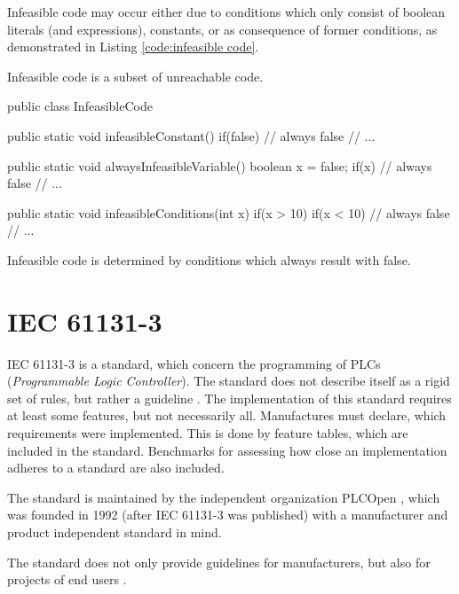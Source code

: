 Infeasible code may occur either due to conditions which only consist of boolean literals (and expressions), constants, or as consequence of former conditions, as demonstrated in Listing \ref{code:infeasible code}.

Infeasible code is a subset of unreachable code.
\begin{program}
	\begin{JavaCode}
public class InfeasibleCode {
	public static void infeasibleConstant() {
		if(false) {
			// always false
			// ...
		}
	}
			
	public static void alwaysInfeasibleVariable() {
		boolean x = false;
		if(x) {
			// always false
			// ...
		}
	}
			
	public static void infeasibleConditions(int x) {
		if(x > 10) {
			if(x < 10) {
				// always false
				// ...
			}
		}
	}
}\end{JavaCode}
	\caption{Infeasible code is determined by conditions which always result with false. }
	\label{code:infeasible code}
\end{program}




\section{IEC 61131-3}
\label{sec:iec}

IEC 61131-3 is a standard, which concern the programming of PLCs (\emph{Programmable Logic Controller}). The standard does not describe itself as a rigid set of rules, but rather a guideline \cite{johnIEC611313Programming2010}. The implementation of this standard requires at least some features, but not necessarily all. Manufactures must declare, which requirements were implemented. This is done by feature tables, which are included in the standard. Benchmarks for assessing how close an implementation adheres to a standard are also included.


The standard is maintained by the independent organization PLCOpen \cite{eldijkWhatPLCopen2018}, which was founded in 1992 (after IEC 61131-3 was published) with a manufacturer and product independent standard in mind.


The standard does not only provide guidelines for manufacturers, but also for projects of end users \cite{johnIEC611313Programming2010}.
